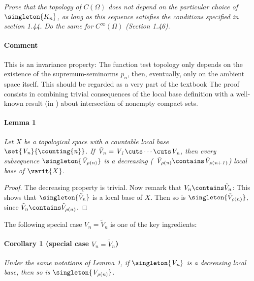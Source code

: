 \textit{
Prove that the topology of $C(\Omega)$ does not depend on the particular 
choice of $\singleton{K_n}$, as long as this sequence satisfies the conditions 
specified in section 1.44. Do the same for $C^\infty(\Omega)$ (Section 1.46).}
%
\paragraph{Comment}This is an invariance property: 
The function test topology only depends on the existence of the 
supremum-seminorms $p_n$, then, eventually, 
only on the ambient space itself. 
This should be regarded as a very part of the textbook \cite{FA}
%
The proof consists in combining trivial consequences of the local base 
definition with a well-known result (\eg [2.6] in \cite{BigRudin}) 
about intersection of nonempty compact sets. 

\paragraph{Lemma 1} {\it %
Let $X$ be a topological space with a countable local base %
$\mathit{\set{V_n}{\counting{n}}}$. 
If 
%
  $\mathit{\tilde{V}_{n} = V_1 \cuts \cdots \cuts V_n}$, 
%
then every subsequence 
% 
  $\mathit{\singleton{\tilde{V}_{\rho(n)}}}$ 
%
is a decreasing (\ie 
%
  $\mathit{\tilde{V}_{\rho(n)} \contains \tilde{V}_{\rho(n+1)}}$)
%
local base of $\varit{X}$.
}
%
\begin{proof}
The decreasing property is trivial. Now remark that 
%
  $V_n \contains \tilde{V}_{n}$:
%
This shows that 
%
  $\singleton{\tilde{V}_{n}}$ 
% 
is a local base of $X$. Then so is 
%
  $\singleton{\tilde{V}_{\rho(n)}}$,
% 
since $\tilde{V}_{n} \contains \tilde{V}_{\rho(n)}$.
\end{proof}
%
\noindent The following special case 
%
  $V_{n} = \tilde{V}_{n}$ 
% 
is one of the key ingredients:
\paragraph{Corollary 1 (special case $V_{n} = \tilde{V}_{n}$)}
{\it Under the same notations of Lemma 1, if $\mathit{\singleton{V_{n}}}$ %
is a decreasing local base, then so is $\mathit{\singleton{V_{\rho(n)}}}$.}
%

